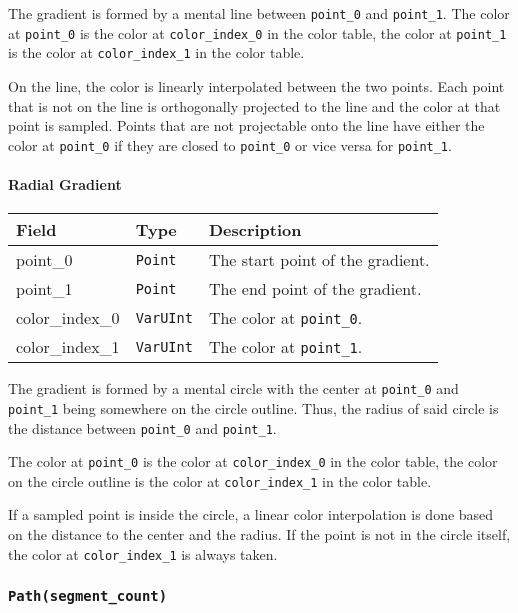 \documentclass[]{article}
\begin{document}
The gradient is formed by a mental line between \texttt{point\_0} and
\texttt{point\_1}. The color at \texttt{point\_0} is the color at
\texttt{color\_index\_0} in the color table, the color at
\texttt{point\_1} is the color at \texttt{color\_index\_1} in the color
table.

On the line, the color is linearly interpolated between the two points.
Each point that is not on the line is orthogonally projected to the line
and the color at that point is sampled. Points that are not projectable
onto the line have either the color at \texttt{point\_0} if they are
closed to \texttt{point\_0} or vice versa for \texttt{point\_1}.

\hypertarget{radial-gradient}{\paragraph{Radial Gradient}\label{radial-gradient}}

\begin{longtable}[]{@{}p{1in}p{1in}p{4in}@{}}
\toprule
Field & Type & Description \\
\midrule
\endhead
point\_0 & \texttt{Point} & The start point of the gradient. \\
point\_1 & \texttt{Point} & The end point of the gradient. \\
color\_index\_0 & \texttt{VarUInt} & The color at \texttt{point\_0}. \\
color\_index\_1 & \texttt{VarUInt} & The color at \texttt{point\_1}. \\
\bottomrule
\end{longtable}

The gradient is formed by a mental circle with the center at
\texttt{point\_0} and \texttt{point\_1} being somewhere on the circle
outline. Thus, the radius of said circle is the distance between
\texttt{point\_0} and \texttt{point\_1}.

The color at \texttt{point\_0} is the color at \texttt{color\_index\_0}
in the color table, the color on the circle outline is the color at
\texttt{color\_index\_1} in the color table.

If a sampled point is inside the circle, a linear color interpolation is
done based on the distance to the center and the radius. If the point is
not in the circle itself, the color at \texttt{color\_index\_1} is
always taken.

\hypertarget{pathsegment_count}{\subsubsection{\texorpdfstring{\texttt{Path(segment\_count)}}{Path(segment\_count)}}\label{pathsegment_count}}
\end{document}

